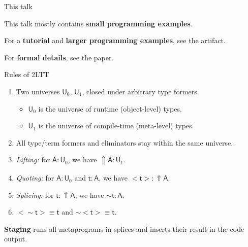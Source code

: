 \documentclass[dvipsnames,aspectratio=169]{beamer}
\newcommand{\msf}[1]{\mathsf{#1}}
\newcommand{\Lift}{{\Uparrow}}
\newcommand{\spl}{{\sim}}
\newcommand{\qut}[1]{{<}#1{>}}
\newcommand{\U}{\msf{U}}
\theoremstyle{remark}
\newcommand{\msA}{\msf{A}}
\newcommand{\mst}{\msf{t}}
\begin{document}
\begin{frame}{This talk}

This talk mostly contains \textbf{small programming examples}.
\vspace{1em}
\pause

For a \textbf{tutorial} and \textbf{larger programming examples}, see the artifact.
\vspace{1em}
\pause

For \textbf{formal details}, see the paper.

\end{frame}

\begin{frame}{Rules of 2LTT}

  \begin{enumerate}
    \item Two universes $\U_0$, $\U_1$, closed under arbitrary type formers.
      \begin{itemize}
        \item $\U_0$ is the universe of runtime (object-level) types.
        \item $\U_1$ is the universe of compile-time (meta-level) types.
      \end{itemize}
    \pause
    \item All type/term formers and eliminators stay within the same universe.
    \pause
    \item \emph{Lifting:} for $\msA : \U_0$, we have $\Lift \msA : \U_1$.
    \pause
    \item \emph{Quoting:} for $\msA : \U_0$ and $\mst : \msA$, we have $\qut{\mst} : \Lift \msA$.
    \pause
    \item \emph{Splicing:} for $\mst : \Lift \msA$, we have $\spl{\mst} : \msA$.
    \pause
    \item $\qut{\spl{\mst}} \equiv \mst$ and $\spl{\qut{\mst}} \equiv \mst$.
  \end{enumerate}
\vspace{1em}
\pause

\begin{block}{}
\textbf{Staging} runs all metaprograms in splices and inserts their result
in the code output.
\end{block}

\end{frame}
\end{document}
